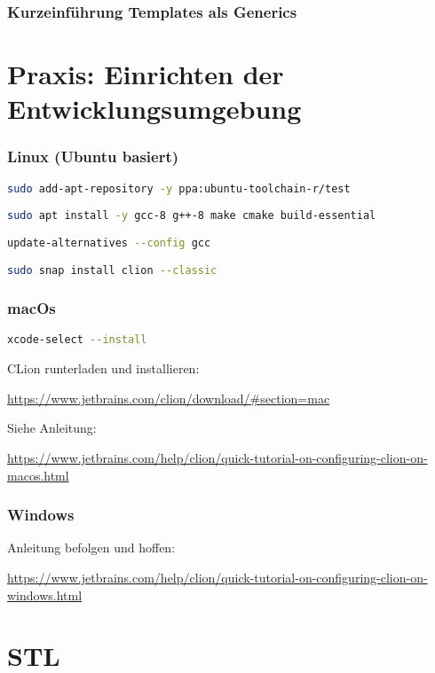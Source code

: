 \documentclass[aspectratio=169]{beamer}
\begin{document}
\begin{frame}
    \frametitle{Kurzeinführung Templates als Generics}
    
\end{frame}

\section{Praxis: Einrichten der Entwicklungsumgebung}

\begin{frame}
    \frametitle{Linux (Ubuntu basiert)}
    \lstinline[language=bash]{sudo add-apt-repository -y ppa:ubuntu-toolchain-r/test}

    \lstinline[language=bash]{sudo apt install -y gcc-8 g++-8 make cmake build-essential}

    \lstinline[language=bash]{update-alternatives --config gcc}

    \vspace{1cm}

    \lstinline[language=bash]{sudo snap install clion --classic}
\end{frame}

\begin{frame}
    \frametitle{macOs}
    \lstinline[language=bash]{xcode-select --install}

    \vspace{1cm}

    CLion runterladen und installieren: 
    
    \url{https://www.jetbrains.com/clion/download/\#section=mac}

    \vspace{1cm}

    Siehe Anleitung: 
    
    \url{https://www.jetbrains.com/help/clion/quick-tutorial-on-configuring-clion-on-macos.html}
\end{frame}

\begin{frame}
    \frametitle{Windows}

    Anleitung befolgen und hoffen: 
    
    \url{https://www.jetbrains.com/help/clion/quick-tutorial-on-configuring-clion-on-windows.html}
\end{frame}

\section{STL}
\end{document}
